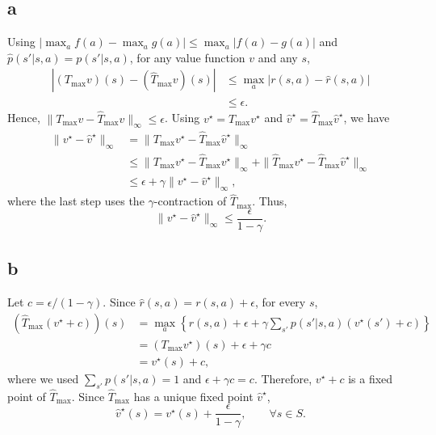 \documentclass{article}
\begin{document}
\subsection*{a}
Using $|\max_a f(a)-\max_a g(a)|\leq\max_a|f(a)-g(a)|$ and
$\hat p(s'|s,a)=p(s'|s,a)$, for any value function $v$ and any $s$,
\[
\begin{aligned}
|(T_{\max}v)(s)-(\hat T_{\max}v)(s)|
&\leq \max_a |r(s,a)-\hat r(s,a)|\\
&\leq \epsilon.
\end{aligned}
\]
Hence, $\|T_{\max}v-\hat T_{\max}v\|_\infty\leq\epsilon$.
Using $v^\star=T_{\max}v^\star$ and
$\hat v^\star=\hat T_{\max}\hat v^\star$, we have
\[
\begin{aligned}
\|v^\star-\hat v^\star\|_\infty
&=\|T_{\max}v^\star-\hat T_{\max}\hat v^\star\|_\infty\\
&\leq \|T_{\max}v^\star-\hat T_{\max}v^\star\|_\infty
+\|\hat T_{\max}v^\star-\hat T_{\max}\hat v^\star\|_\infty\\
&\leq \epsilon+\gamma\|v^\star-\hat v^\star\|_\infty,
\end{aligned}
\]
where the last step uses the $\gamma$-contraction of $\hat T_{\max}$.
Thus,
\[
\|v^\star-\hat v^\star\|_\infty\leq\frac{\epsilon}{1-\gamma}.
\]

\subsection*{b}
Let $c=\epsilon/(1-\gamma)$. Since
$\hat r(s,a)=r(s,a)+\epsilon$, for every $s$,
\[
\begin{aligned}
(\hat T_{\max}(v^\star+c))(s)
&=\max_a\left\{r(s,a)+\epsilon
+\gamma\sum_{s'}p(s'|s,a)(v^\star(s')+c)\right\}\\
&=(T_{\max}v^\star)(s)+\epsilon+\gamma c\\
&=v^\star(s)+c,
\end{aligned}
\]
where we used $\sum_{s'}p(s'|s,a)=1$ and
$\epsilon+\gamma c=c$.
Therefore, $v^\star+c$ is a fixed point of $\hat T_{\max}$.
Since $\hat T_{\max}$ has a unique fixed point $\hat v^\star$,
\[
\hat v^\star(s)=v^\star(s)+\frac{\epsilon}{1-\gamma},
\qquad \forall s\in S.
\]
\end{document}
